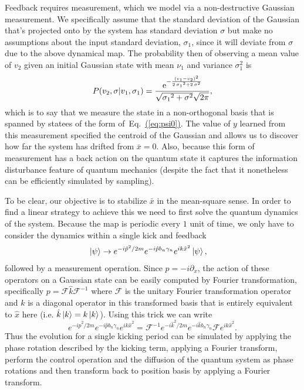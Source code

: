 \documentclass[superscriptaddress,aps,pra,nofootinbib,onecolumn,notitlepage,10pt]{revtex4-1}
\newcommand{\eq}[1]{Eq.~\hyperref[eq:#1]{(\ref*{eq:#1})}}
\def\ket#1{\mathinner{|{#1}\rangle}}
\begin{document}
Feedback requires measurement, which we model via a non-destructive Gaussian measurement.  We specifically assume that the standard deviation of the Gaussian that's projected onto by the system has standard deviation $\sigma$ but make no assumptions about the input standard deviation, $\sigma_1$, since it will deviate from $\sigma$ due to the above dynamical map.
The probability then of observing a mean value of $v_2$ given an initial Gaussian state with mean $\nu_1$ and variance $\sigma_1^2$ is
\begin{equation}
P(v_2,\sigma|v_1,\sigma_1) = \frac {{\rm e}^{-{\frac { \left( v_1-v_2 \right) ^{2}}{2\,{{
\sigma_1}}^{2}+2\,{{\sigma}}^{2}}}}}{\sqrt {{{\sigma_1}}^{2}+{{\sigma}}^{2}}
\sqrt {2\pi}}
,
\end{equation}
which is to say that we measure the state in a non-orthogonal basis that is spanned by statees of the form of~\eq{psi0}.  The value of $y$ learned from this measurement specified
the centroid of the Gaussian and allows us to discover how far the system has drifted from $\bar{x}=0$.  Also, because this form of measurement has a back action on the quantum state it captures the information disturbance feature of quantum mechanics (despite the fact that it nonetheless can be efficiently simulated by sampling).

To be clear, our objective is to stabilize $\bar{x}$ in the mean-square sense.  In order to find a linear strategy to achieve this we need to first solve the quantum dynamics of the system.
Because the map is periodic every $1$ unit of time, we only have to consider the dynamics within a single kick and feedback
\begin{align}
\ket{\psi} &\rightarrow e^{-i \hat{p}^2/2m}e^{-i\hat{p}b_n \gamma_n} e^{i k\hat{x}^2}\ket{\psi},
\end{align}
followed by a measurement operation.  Since $p=- i\partial_x$, the action of these operators on a Gaussian state can be easily computed by Fourier transformation, specifically $p=\mathcal{F} \hat{k} \mathcal{F}^{-1}$ where $\mathcal{F}$ is the unitary Fourier transformation operator and $k$ is a diagonal operator in this transformed basis that is entirely equivalent to $\hat{x}$ here (i.e. $\hat{k} \ket{k} = k\ket{k}$).  Using this trick we can write
\begin{equation}
e^{-i \hat{p}^2/2m}e^{-i\hat{p}b_n \gamma_n} e^{i k\hat{x}^2}=\mathcal{F}^{-1}e^{-i \hat{k}^2/2m}e^{-i\hat{k}b_n \gamma_n}\mathcal{F} e^{i k\hat{x}^2}.
\end{equation}
Thus the evolution for a single kicking period can be simulated by applying the phase rotation described by the kicking term, applying a Fourier transform, perform the control operation and the diffusion of the quantum system as phase rotations and then transform back to position basis by applying a Fourier transform.
\end{document}
